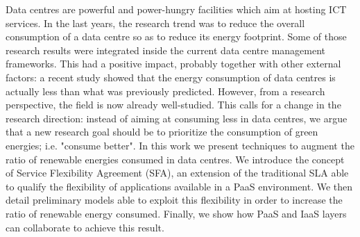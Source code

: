 
Data centres are powerful and power-hungry facilities which aim at hosting ICT services.
In the last years, the research trend was to reduce the overall consumption of a data centre so as to reduce its energy footprint.
Some of those research results were integrated inside the current data centre management frameworks.
This had a positive impact, probably together with other external factors: a recent study showed that the energy consumption of data centres is actually less than what was previously predicted.
However, from a research perspective, the field is now already well-studied.
This calls for a change in the research direction: instead of aiming at consuming less in data centres, we argue that a new research goal should be to prioritize the consumption of green energies; i.e. "consume better".
In this work we present techniques to augment the ratio of renewable energies consumed in data centres.
We introduce the concept of Service Flexibility Agreement (SFA), an extension of the traditional SLA able to qualify the flexibility of applications available in a PaaS environment.
We then detail preliminary models able to exploit this flexibility in order to increase the ratio of renewable energy consumed.
Finally, we show how PaaS and IaaS layers can collaborate to achieve this result.
